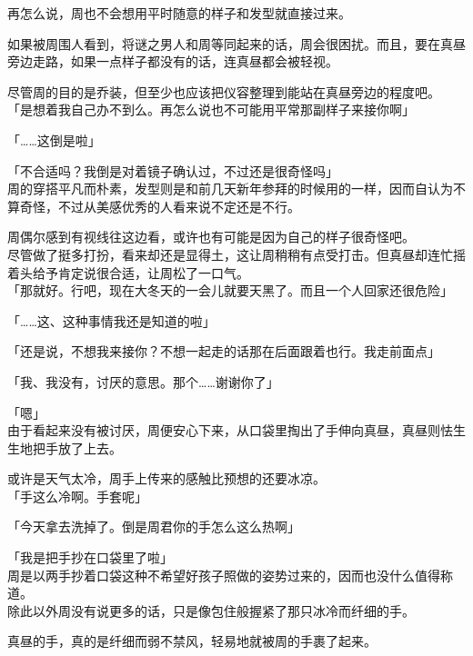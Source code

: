 再怎么说，周也不会想用平时随意的样子和发型就直接过来。

如果被周围人看到，将谜之男人和周等同起来的话，周会很困扰。而且，要在真昼旁边走路，如果一点样子都没有的话，连真昼都会被轻视。

尽管周的目的是乔装，但至少也应该把仪容整理到能站在真昼旁边的程度吧。\\

「是想着我自己办不到么。再怎么说也不可能用平常那副样子来接你啊」

「……这倒是啦」

「不合适吗？我倒是对着镜子确认过，不过还是很奇怪吗」\\

周的穿搭平凡而朴素，发型则是和前几天新年参拜的时候用的一样，因而自认为不算奇怪，不过从美感优秀的人看来说不定还是不行。

周偶尔感到有视线往这边看，或许也有可能是因为自己的样子很奇怪吧。\\

尽管做了挺多打扮，看来却还是显得土，这让周稍稍有点受打击。但真昼却连忙摇着头给予肯定说很合适，让周松了一口气。\\

「那就好。行吧，现在大冬天的一会儿就要天黑了。而且一个人回家还很危险」

「……这、这种事情我还是知道的啦」

「还是说，不想我来接你？不想一起走的话那在后面跟着也行。我走前面点」

「我、我没有，讨厌的意思。那个……谢谢你了」

「嗯」\\

由于看起来没有被讨厌，周便安心下来，从口袋里掏出了手伸向真昼，真昼则怯生生地把手放了上去。

或许是天气太冷，周手上传来的感触比预想的还要冰凉。\\

「手这么冷啊。手套呢」

「今天拿去洗掉了。倒是周君你的手怎么这么热啊」

「我是把手抄在口袋里了啦」\\

周是以两手抄着口袋这种不希望好孩子照做的姿势过来的，因而也没什么值得称道。\\

除此以外周没有说更多的话，只是像包住般握紧了那只冰冷而纤细的手。

真昼的手，真的是纤细而弱不禁风，轻易地就被周的手裹了起来。\\

